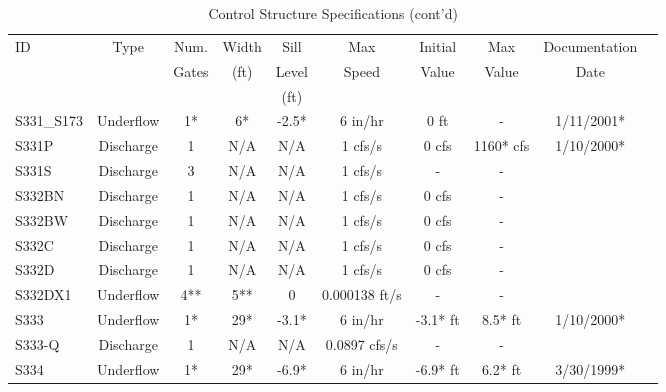 \scriptsize
\begin{table}[h]
\caption{Control Structure Specifications (cont'd)}
\label{tab:struc-specs3}
\begin{tabular}{@{}lccccccccc@{}}
\toprule
{ID}            & {Type}        & Num.     & Width       & Sill         & Max         & Initial         & Max     & Documentation  \\
                &               & Gates    & (ft)        & Level        & Speed       & Value           & Value   & Date           \\
                &               &          &             & (ft)         &             &                 &         &                \\
\hline
{S331\_S173}    & Underflow     & 1*       & 6*          & -2.5*        & 6 in/hr        & 0 ft            & -          & 1/11/2001*  \\
{S331P}         & Discharge     & 1        & N/A         & N/A          & 1 cfs/s        & 0 cfs           & 1160* cfs  & 1/10/2000*  \\
{S331S}         & Discharge     & 3        & N/A         & N/A          & 1 cfs/s        & -               & -          &             \\
{S332BN}        & Discharge     & 1        & N/A         & N/A          & 1 cfs/s        & 0 cfs           & -          &             \\
{S332BW}        & Discharge     & 1        & N/A         & N/A          & 1 cfs/s        & 0 cfs           & -          &             \\
{S332C}         & Discharge     & 1        & N/A         & N/A          & 1 cfs/s        & 0 cfs           & -          &             \\
{S332D}         & Discharge     & 1        & N/A         & N/A          & 1 cfs/s        & 0 cfs           & -          &             \\
{S332DX1}       & Underflow     & 4**      & 5**         & 0            & 0.000138 ft/s  & -               & -          &             \\
{S333}          & Underflow     & 1*       & 29*         & -3.1*        & 6 in/hr        & -3.1* ft        & 8.5* ft    & 1/10/2000*  \\
{S333-Q}        & Discharge     & 1        & N/A         & N/A          & 0.0897 cfs/s   & -               & -          &             \\
{S334}          & Underflow     & 1*       & 29*         & -6.9*        & 6 in/hr        & -6.9* ft        & 6.2* ft    & 3/30/1999*  \\

\end{tabular}
\end{table}
